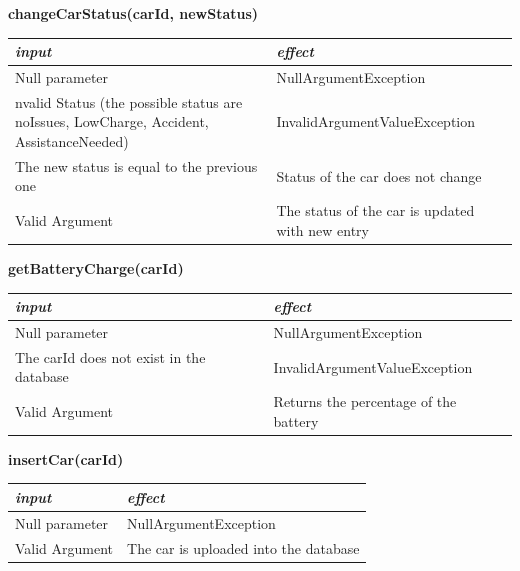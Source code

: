 \documentclass{article}
\begin{document}
\begin{flushleft}
       \begin{center}
   \begin {flushleft}
    \textbf{changeCarStatus(carId, newStatus)}
    \end{flushleft}
        \begin{tabular}{  |  p{6cm} | p{6cm} |}
    \hline
    \textit{input} &  \textit{effect} \\
    \hline
    
    Null parameter & NullArgumentException 
     \\ 
  \hline
   nvalid Status (the possible status are noIssues, LowCharge, Accident, AssistanceNeeded) & InvalidArgumentValueException \\
  \hline
  The new status is equal to the previous one &  Status of the car does not change  \\
  \hline
  Valid Argument & The status of the car is updated with  new entry\\
  \hline

    \end{tabular}
\end{center}

  \begin{center}
   \begin {flushleft}
    \textbf{getBatteryCharge(carId)}
    \end{flushleft}
        \begin{tabular}{  |  p{6cm} | p{6cm} |}
    \hline
    \textit{input} &  \textit{effect} \\
    \hline
    
    Null parameter & NullArgumentException
     \\ 
  \hline
   The carId does not exist in the database &  InvalidArgumentValueException \\
  \hline
  Valid Argument & Returns the percentage of the battery    \\
  \hline
    \end{tabular}
\end{center}

  \begin{center}
   \begin {flushleft}
    \textbf{insertCar(carId)}
    \end{flushleft}
        \begin{tabular}{  |  p{6cm} | p{6cm} |}
    \hline
    \textit{input} &  \textit{effect} \\
  
  \hline
   Null parameter & NullArgumentException \\
  \hline
  Valid Argument &  The car is uploaded into the database  \\
  \hline
    \end{tabular}
\end{center}


\end{flushleft}
\end{document}
